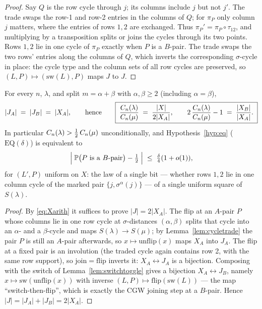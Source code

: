 \begin{proof}
Say $Q$ is the row cycle through $j$; its columns include $j$ but not
$j'$.  The trade swaps the row-1 and row-2 entries in the columns of
$Q$; for $\pi_P$ only column $j$ matters, where the entries of rows
$1,2$ are exchanged.  Thus $\pi_P'=\pi_P\circ\tau_{12}$, and
multiplying by a transposition splits or joins the cycles through its
two points.  Rows $1,2$ lie in one cycle of $\pi_P$ exactly when $P$
is a $B$-pair.  The trade swaps the two rows' entries along the
columns of $Q$, which inverts the corresponding $\sigma$-cycle in
place: the cycle type and the column sets of all row cycles are
preserved, so $(L,P)\mapsto(\mathrm{sw}(L),P)$ maps $J$ to $J$.
\end{proof}

\begin{theorem}\label{thm:marked}
For every $n$, $\lambda$, and split $m=\alpha+\beta$ with
$\alpha,\beta\ge2$ (including $\alpha=\beta$),
\[
|J_A|\;=\;|J_B|\;=\;|X_A|,
\qquad\text{hence}\qquad
\boxed{\;\frac{\CC_n(\lambda)}{\CC_n(\mu)}\;=\;\frac{|X|}{2|X_A|},
\qquad
2\,\frac{\CC_n(\lambda)}{\CC_n(\mu)}-1\;=\;\frac{|X_B|}{|X_A|}.\;}
\]
In particular $\CC_n(\lambda)>\tfrac12\,\CC_n(\mu)$ unconditionally,
and Hypothesis~\ref{hyp:eq} ($\mathrm{EQ}(\delta)$) is equivalent to
\[
\Bigl|\;\Pr\bigl(P\text{ is a $B$-pair}\bigr)-\tfrac12\;\Bigr|
\;\le\;\tfrac{\delta}{4}(1+o(1)),
\]
for $(L',P)$ uniform on $X$: the law of a single bit --- whether rows
$1,2$ lie in one column cycle of the marked pair
$\{j,\sigma^\alpha(j)\}$ --- of a single uniform square of
$S(\lambda)$.
\end{theorem}

\begin{proof}
By \eqref{eq:Xarith} it suffices to prove $|J|=2|X_A|$.
The flip at an $A$-pair $P$ whose columns lie in one row cycle at
$\sigma$-distances $(\alpha,\beta)$ splits that cycle into an
$\alpha$- and a $\beta$-cycle and maps $S(\lambda)\to S(\mu)$; by
Lemma~\ref{lem:cycletrade} the pair $P$ is still an $A$-pair
afterwards, so $x\mapsto\mathrm{unflip}(x)$ maps $X_A$ into $J_A$.
The flip at a fixed pair is an involution (the traded cycle again
contains row 2, with the same row support), so
$\mathrm{join}=\mathrm{flip}$ inverts it: $X_A\leftrightarrow J_A$ is
a bijection.  Composing with the switch of
Lemma~\ref{lem:switchtoggle} gives a bijection
$X_A\leftrightarrow J_B$, namely
$x\mapsto \mathrm{sw}(\mathrm{unflip}(x))$ with inverse
$(L,P)\mapsto \mathrm{flip}(\mathrm{sw}(L))$ --- the map
``switch-then-flip'', which is exactly the CGW joining step at a
$B$-pair.  Hence $|J|=|J_A|+|J_B|=2|X_A|$.
\end{proof}

